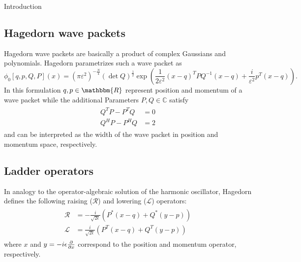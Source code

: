 \begin{chapter}{Introduction}
\subsection{Hagedorn wave packets} %
\label{sub:Hagedorn wave packets}
Hagedorn wave packets are basically a product of complex Gaussians and polynomials. Hagedorn \cite{H_ladder_operators} parametrizes such a wave packet as
\begin{equation}
    \label{eq:HG_wavepacket}
    \phi_0[q,p,Q,P](x)=(\pi\varepsilon^2)^{-\frac{N}{4}}(\det Q)^{\frac{1}{2}}\exp\left(\frac{1}{2\varepsilon^2}(x-q)^TPQ^{-1}(x-q)+\frac{i}{\varepsilon^2}p^T(x-q) \right).
\end{equation}
In this formulation $q,p\in\mathbbm{R}$ represent position and momentum of a wave packet while the additional Parameters $P,Q\in\mathbb{C}$ satisfy
\begin{align}
	\label{eq:HG_param_relations}
	\begin{split}
	Q^TP-P^TQ&=0\\
	Q^HP-P^HQ&=2
	\end{split}
\end{align}
and can be interpreted as the width of the wave packet in position and momentum space,
respectively.

\subsection{Ladder operators} %
\label{sub:Ladder Operators}

In analogy to the operator-algebraic solution of the harmonic oscillator, Hagedorn defines the following raising ($\mathcal{R}$)
and lowering ($\mathcal{L}$) operators:
\begin{align}
    \label{eq:HG_ladder}
    \begin{split}
    \mathcal{R}&=-\frac{i}{\sqrt{2\epsilon}}\left(P^*(x-q)+Q^*(y-p)\right)\\
    \mathcal{L}&=\frac{i}{\sqrt{2\epsilon}}\left(P^T(x-q)+Q^T(y-p)\right)
    \end{split}
\end{align}
where $x$ and $y=-i\epsilon\frac{\partial }{\partial x}$ correspond to the position and momentum operator, respectively.\\


\end{chapter}
